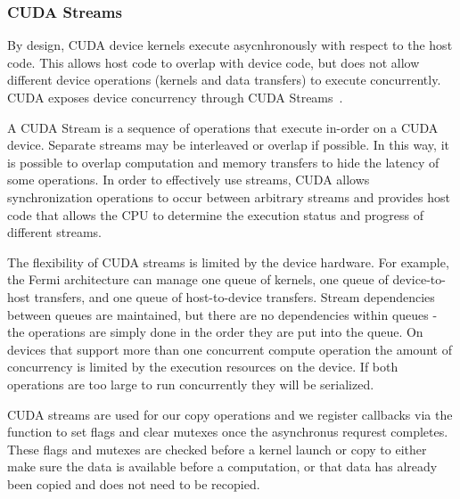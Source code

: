 
\subsubsection{CUDA Streams}
By design, CUDA device kernels execute asycnhronously with respect to the
host code. This allows host code to overlap with device code, but does not
allow different device operations (kernels and data transfers) to execute
concurrently. CUDA exposes device concurrency through CUDA Streams~\cite{kirk2012programming}.

A CUDA Stream is a sequence of operations that
execute in-order on a CUDA device. Separate streams may be interleaved or
overlap if possible. In this way, it is possible to overlap computation and
memory transfers to hide the latency of some operations.
In order to effectively use streams, CUDA allows synchronization operations
to occur between arbitrary streams and provides host code that allows the
CPU to determine the execution status and progress of different streams.

The flexibility of CUDA streams is limited by the device hardware.
For example, the Fermi architecture can manage one queue of kernels, one queue
of device-to-host transfers, and one queue of host-to-device
transfers. Stream
dependencies between queues are maintained, but there are no dependencies
within queues - the operations are simply done in the order they are put into
the queue.
On devices that support more than one concurrent compute operation the amount
of concurrency is limited by the execution resources on the device. If both
operations are too large to run concurrently they will be serialized.


CUDA streams are used for our copy operations and we register callbacks via the  function to set flags and clear mutexes once
the asynchronus requrest completes.
These flags and mutexes are checked before a kernel launch or copy to either	make sure the data is available before a computation, or that data has
	already been copied and does not need to be recopied.

	
